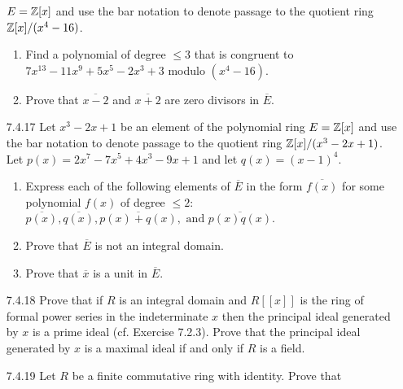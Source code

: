 \begin{enumerate}
                  $E = \mathbb{Z}[x]$ and use the bar notation to denote passage to the
                  quotient ring $\mathbb{Z}[x]/(x^4 - 16)$.
                  \begin{enumerate}
                     \item Find a polynomial of degree $\le 3$ that is congruent
                           to $7x^{13} - 11x^9 + 5x^5 - 2x^3 + 3$ modulo
                           $(x^4 - 16)$.
                     \item Prove that $\overline{x - 2}$ and $\overline{x + 2}$
                           are zero divisors in $\overline{E}$.
                  \end{enumerate}
   \item[7.4.17]  Let $x^3 - 2x + 1$ be an element of the polynomial ring
                  $E = \mathbb{Z}[x]$ and use the bar notation to denote passage to the
                  quotient ring $\mathbb{Z}[x]/(x^3 - 2x + 1)$. Let
                  $p(x) = 2x^7 - 7x^5 + 4x^3 - 9x + 1$ and let
                  $q(x) = (x - 1)^4$.
                  \begin{enumerate}
                     \item Express each of the following elements of
                           $\overline{E}$ in the form $\overline{f(x)}$ for some
                           polynomial $f(x)$ of degree $\le 2$:
                           $\overline{p(x)}, \overline{q(x)},
                             \overline{p(x) + q(x)}, \text{ and }
                             \overline{p(x)q(x)}$.
                     \item Prove that $\overline{E}$ is not an integral domain.
                     \item Prove that $\overline{x}$ is a unit in
                           $\overline{E}$.
                  \end{enumerate}
   \item[7.4.18]  Prove that if $R$ is an integral domain and $R[[x]]$ is the
                  ring of formal power series in the indeterminate $x$ then the
                  principal ideal generated by $x$ is a prime ideal
                  (cf. Exercise 7.2.3). Prove that the principal ideal generated
                  by $x$ is a maximal ideal if and only if $R$ is a field.
   \item[7.4.19]  Let $R$ be a finite commutative ring with identity. Prove that

\end{enumerate}
